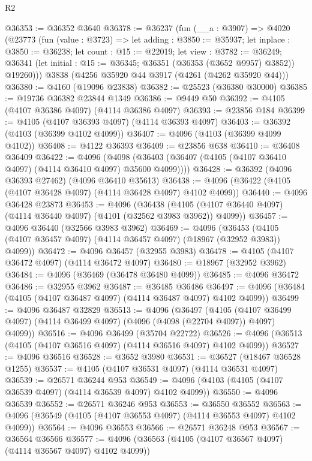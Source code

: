 \begin{lexlean}{R2}
\begin{coremodule}
@36353 := @36352 @3640
@36378 := @36237
    (fun (__a : @3907) =>
    @4020
      (@23773
        (fun (value : @3723) =>
        let adding : @3850 := @35937;
        let inplace : @3850 := @36238;
        let count : @15 := @22019;
        let view : @3782 := @36249;
        @36341 (let initial : @15 := @36345; @36351 (@36353 (@3652 @9957) @3852)) @19260)))
    @3838
    (@4256 @35920 @44 @3917 (@4261 (@4262 @35920 @44)))
@36380 := @4160 (@19096 @23838)
@36382 := @25523 (@36380 @30000)
@36385 := @19736 @36382 @23844 @1349
@36386 := @9449 @50
@36392 := @4105 (@4107 @36386 @4097) (@4114 @36386 @4097)
@36393 := @23856 @184
@36399 := @4105 (@4107 @36393 @4097) (@4114 @36393 @4097)
@36403 := @36392 (@4103 (@36399 @4102 @4099))
@36407 := @4096 (@4103 (@36399 @4099 @4102))
@36408 := @4122 @36393
@36409 := @23856 @638
@36410 := @36408 @36409
@36422 := @4096
    (@4098 (@36403 (@36407 (@4105 (@4107 @36410 @4097) (@4114 @36410 @4097) @35600 @4099))))
@36428 := @36392 (@4096 @36393 @27462) (@4096 @36410 @35613)
@36438 := @4096 (@36422 (@4105 (@4107 @36428 @4097) (@4114 @36428 @4097) @4102 @4099))
@36440 := @4096 @36428 @23873
@36453 := @4096
    (@36438 (@4105 (@4107 @36440 @4097) (@4114 @36440 @4097) (@4101 (@32562 @3983 @3962)) @4099))
@36457 := @4096 @36440 (@32566 @3983 @3962)
@36469 := @4096
    (@36453 (@4105 (@4107 @36457 @4097) (@4114 @36457 @4097) (@18967 (@32952 @3983)) @4099))
@36472 := @4096 @36457 (@32955 @3983)
@36478 := @4105 (@4107 @36472 @4097) (@4114 @36472 @4097)
@36480 := @18967 (@32952 @3962)
@36484 := @4096 (@36469 (@36478 @36480 @4099))
@36485 := @4096 @36472
@36486 := @32955 @3962
@36487 := @36485 @36486
@36497 := @4096 (@36484 (@4105 (@4107 @36487 @4097) (@4114 @36487 @4097) @4102 @4099))
@36499 := @4096 @36487 @32829
@36513 := @4096
    (@36497
      (@4105 (@4107 @36499 @4097) (@4114 @36499 @4097) (@4096 (@4098 (@22704 @4097)) @4097) @4099))
@36516 := @4096 @36499 (@35704 @22722)
@36526 := @4096 (@36513 (@4105 (@4107 @36516 @4097) (@4114 @36516 @4097) @4102 @4099))
@36527 := @4096 @36516
@36528 := @3652 @3980
@36531 := @36527 (@18467 @36528 @1255)
@36537 := @4105 (@4107 @36531 @4097) (@4114 @36531 @4097)
@36539 := @26571 @36244 @953
@36549 := @4096 (@4103 (@4105 (@4107 @36539 @4097) (@4114 @36539 @4097) @4102 @4099))
@36550 := @4096 @36539
@36552 := @26571 @36246 @953
@36553 := @36550 @36552
@36563 := @4096 (@36549 (@4105 (@4107 @36553 @4097) (@4114 @36553 @4097) @4102 @4099))
@36564 := @4096 @36553
@36566 := @26571 @36248 @953
@36567 := @36564 @36566
@36577 := @4096 (@36563 (@4105 (@4107 @36567 @4097) (@4114 @36567 @4097) @4102 @4099))

\end{coremodule}
\end{lexlean}
